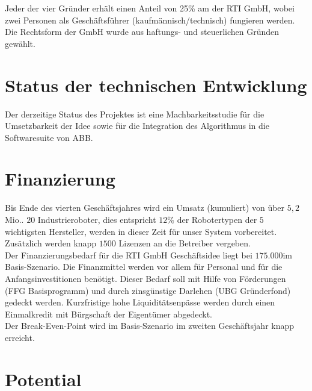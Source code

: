 Jeder der vier Gründer erhält einen Anteil von 25\% am der \textsf{RTI GmbH}, wobei zwei Personen als Geschäftsführer (kaufmännisch/technisch) fungieren werden. Die Rechtsform der GmbH wurde aus haftungs- und steuerlichen Gründen gewählt.


\section{Status der technischen Entwicklung}

Der derzeitige Status des Projektes ist eine Machbarkeitsstudie für die Umsetzbarkeit der Idee sowie für die Integration des Algorithmus in die Softwaresuite von ABB.

\section{Finanzierung}
Bis Ende des vierten Geschäftsjahres wird ein Umsatz (kumuliert) von über $5,2$Mio.\thinspace\officialeuro. $20$ Industrieroboter, dies entspricht $12$\% der Robotertypen der $5$ wichtigsten Hersteller, werden in dieser Zeit für unser System vorbereitet. Zusätzlich werden knapp $1500$ Lizenzen an die Betreiber vergeben.\\
Der Finanzierungsbedarf für die \textsf{RTI GmbH} Geschäftsidee liegt bei $175.000$\officialeuro im Basis-Szenario. Die Finanzmittel werden vor allem für Personal und für die Anfangsinvestitionen benötigt. Dieser Bedarf soll mit Hilfe von Förderungen (FFG Basisprogramm) und durch zinsgünstige Darlehen (UBG Gründerfond) gedeckt werden. Kurzfristige hohe Liquiditätsenpässe werden durch einen Einmalkredit mit Bürgschaft der Eigentümer abgedeckt.\\
Der Break-Even-Point wird im Basis-Szenario im zweiten Geschäftsjahr knapp erreicht.


\section{Potential}
